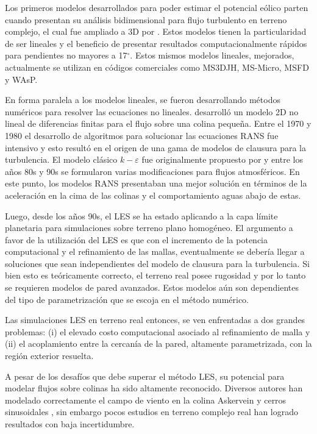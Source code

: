 Los primeros modelos desarrollados para poder estimar el potencial eólico parten cuando \cite{jackson1975turbulent} presentan su análisis bidimensional para flujo turbulento en terreno complejo, el cual fue ampliado a 3D por \cite{mason1979flow}. Estos modelos tienen la particularidad de ser lineales y el beneficio de presentar resultados computacionalmente rápidos para pendientes no mayores a 17$^\circ$. Estos mismos modelos lineales, mejorados, actualmente se utilizan en códigos comerciales como MS3DJH, MS-Micro, MSFD y WAsP.

En forma paralela a los modelos lineales, se fueron desarrollando métodos numéricos para resolver las ecuaciones no lineales. \cite{taylor1977some} desarrolló un modelo 2D no lineal de diferencias finitas para el flujo sobre una colina pequeña. Entre el 1970 y 1980 el desarrollo de algoritmos para solucionar las ecuaciones RANS fue intensivo y esto resultó en el origen de una gama de modelos de clausura para la turbulencia. El modelo clásico $k-\varepsilon$ fue originalmente propuesto por \cite{launder1974numerical} y entre los años 80s y 90s se formularon varias modificaciones para flujos atmosféricos. En este punto, los modelos RANS presentaban una mejor solución en términos de la aceleración en la cima de las colinas y el comportamiento aguas abajo de estas.

Luego, desde los años 90s, el LES se ha estado aplicando a la capa límite planetaria para simulaciones sobre terreno plano homogéneo. El argumento a favor de la utilización del LES es que con el incremento de la potencia computacional y el refinamiento de las mallas, eventualmente se debería llegar a soluciones que sean independientes del modelo de clausura para la turbulencia. Si bien esto es teóricamente correcto, el terreno real posee rugosidad y por lo tanto se requieren modelos de pared avanzados. Estos modelos aún son dependientes del tipo de parametrización que se escoja en el método numérico.

Las simulaciones LES en terreno real entonces, se ven enfrentadas a dos grandes problemas: (i) el elevado costo computacional asociado al refinamiento de malla y (ii) el acoplamiento entre la cercanía de la pared, altamente parametrizada, con la región exterior resuelta.

A pesar de los desafíos que debe superar el método LES, su potencial para modelar flujos sobre colinas ha sido altamente reconocido. Diversos autores han modelado correctamente el campo de viento en la colina Askervein \citep{Chow2009,doi:10.1002/we.414} y cerros sinusoidales \citep{brown2001large,wan2007evaluation}, sin embargo pocos estudios en terreno complejo real han logrado resultados con baja incertidumbre.

